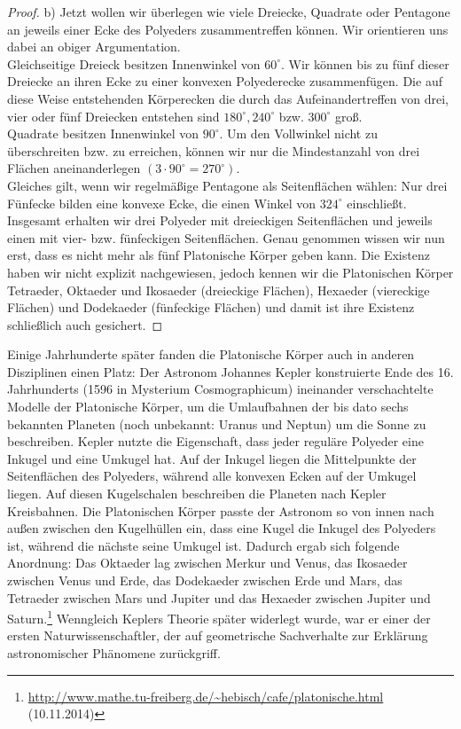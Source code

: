 \begin{proof}
b) Jetzt wollen wir überlegen wie viele Dreiecke, Quadrate oder Pentagone an jeweils einer Ecke des Polyeders zusammentreffen können. Wir orientieren uns dabei an obiger Argumentation.\\
Gleichseitige Dreieck besitzen Innenwinkel von $60^\circ$. Wir können bis zu fünf dieser Dreiecke an ihren Ecke zu einer konvexen Polyederecke zusammenfügen. Die auf diese Weise entstehenden Körperecken die durch das Aufeinandertreffen von drei, vier oder fünf Dreiecken entstehen sind  $180^\circ, 240^\circ$ bzw. $300^\circ$ groß.\\
Quadrate besitzen Innenwinkel von $90^\circ$. Um den Vollwinkel nicht zu überschreiten bzw. zu erreichen, können wir nur die Mindestanzahl von drei Flächen aneinanderlegen $(3\cdot90^\circ=270^\circ)$.\\
Gleiches gilt, wenn wir regelmäßige Pentagone als Seitenflächen wählen: Nur drei Fünfecke bilden eine konvexe Ecke, die einen Winkel von $324^\circ$ einschließt.\\
Insgesamt erhalten wir drei Polyeder mit dreieckigen Seitenflächen und jeweils einen mit vier- bzw. fünfeckigen Seitenflächen. Genau genommen wissen wir nun erst, dass es nicht mehr als fünf Platonische Körper geben kann. Die Existenz haben wir nicht explizit nachgewiesen, jedoch kennen wir die Platonischen Körper Tetraeder, Oktaeder und  Ikosaeder (dreieckige Flächen), Hexaeder (viereckige Flächen) und Dodekaeder (fünfeckige Flächen) und damit ist ihre Existenz schließlich auch gesichert.
\end{proof}
Einige Jahrhunderte später fanden die Platonische Körper auch in anderen Disziplinen einen Platz:
Der Astronom Johannes Kepler konstruierte Ende des 16. Jahrhunderts (1596 in Mysterium Cosmographicum) ineinander verschachtelte Modelle der Platonische Körper, um die Umlaufbahnen der bis dato sechs bekannten Planeten (noch unbekannt: Uranus und Neptun) um die Sonne zu beschreiben. Kepler nutzte die Eigenschaft, dass jeder reguläre Polyeder eine Inkugel und eine Umkugel hat. Auf der Inkugel liegen die Mittelpunkte der Seitenflächen des Polyeders, während alle konvexen Ecken auf der Umkugel liegen. Auf diesen Kugelschalen beschreiben die Planeten nach Kepler Kreisbahnen. Die Platonischen Körper passte der Astronom so von innen nach außen zwischen den Kugelhüllen ein, dass eine Kugel die Inkugel des Polyeders ist, während die nächste seine Umkugel ist. Dadurch ergab sich folgende Anordnung: Das Oktaeder lag zwischen Merkur und Venus, das Ikosaeder zwischen Venus und Erde, das Dodekaeder zwischen Erde und Mars, das Tetraeder zwischen Mars und Jupiter und das Hexaeder zwischen Jupiter und Saturn.\footnote{\url{http://www.mathe.tu-freiberg.de/~hebisch/cafe/platonische.html} (10.11.2014)}  Wenngleich Keplers Theorie später widerlegt wurde, war er einer der ersten Naturwissenschaftler, der auf geometrische Sachverhalte zur Erklärung astronomischer Phänomene zurückgriff.\\
